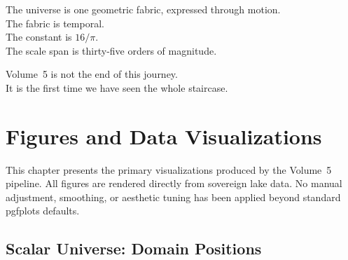 \documentclass[11pt, letterpaper, openany]{book}
\begin{document}
The universe is one geometric fabric, expressed through motion.\\
The fabric is temporal.\\
The constant is $16/\pi$.\\
The scale span is thirty-five orders of magnitude.

Volume~5 is not the end of this journey.\\
It is the first time we have seen the whole staircase.

\chapter{Figures and Data Visualizations}

This chapter presents the primary visualizations produced by the Vol\-ume~5 pipeline. All
figures are rendered directly from sovereign lake data. No manual adjustment, smoothing, or
aesthetic tuning has been applied beyond standard pgfplots defaults.

\clearpage

\section{Scalar Universe: Domain Positions}
\end{document}

